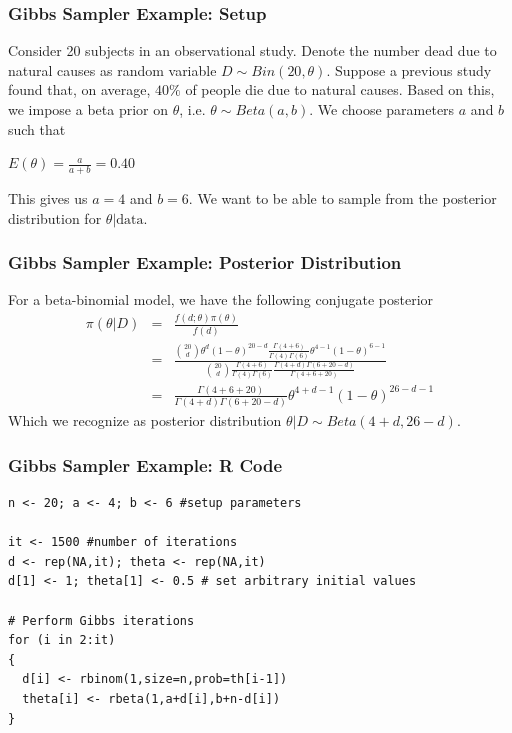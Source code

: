 \documentclass{beamer}
\begin{document}
\begin{frame}
\frametitle{Gibbs Sampler Example: Setup}
Consider 20 subjects in an observational study. Denote the number dead due to natural causes as random variable $D \sim Bin(20,\theta)$.  Suppose a previous study found that, on average, $40\%$ of people die due to natural causes. Based on this, we impose a beta prior on $\theta$, i.e. $\theta \sim Beta(a,b)$. We choose parameters $a$ and $b$ such that 
\begin{center}
$E(\theta) = \frac{a}{a+b} = 0.40$
\end{center}
This gives us $a = 4$ and $b = 6$. We want to be able to sample from the posterior distribution for $\theta|\text{data}$. 
\end{frame}

\begin{frame}
\frametitle{Gibbs Sampler Example: Posterior Distribution}
For a beta-binomial model, we have the following conjugate posterior
\begin{eqnarray*}
\pi(\theta|D) &=& \frac{f(d;\theta)\pi(\theta)}{f(d)} \\
&=& \frac{{20 \choose d}\theta^{d}(1-\theta)^{20-d} \frac{\Gamma(4 + 6)}{\Gamma(4)\Gamma(6)}\theta^{4-1}(1-\theta)^{6-1}}{{20 \choose d} \frac{\Gamma(4 + 6)}{\Gamma(4)\Gamma(6)} \frac{\Gamma(4 + d)\Gamma(6 + 20 - d)}{\Gamma(4+6+20)}} \\
&=& \frac{\Gamma(4+6+20)}{\Gamma(4 + d)\Gamma(6 + 20 - d)}\theta^{4+d-1}(1-\theta)^{26-d-1} 
\end{eqnarray*}
Which we recognize as posterior distribution $\theta|D \sim Beta(4+d, 26-d)$. 
\end{frame}

\begin{frame}[fragile]
\frametitle{Gibbs Sampler Example: R Code\footnotemark}
\begin{verbatim}
n <- 20; a <- 4; b <- 6 #setup parameters

it <- 1500 #number of iterations
d <- rep(NA,it); theta <- rep(NA,it) 
d[1] <- 1; theta[1] <- 0.5 # set arbitrary initial values

# Perform Gibbs iterations
for (i in 2:it)
{
  d[i] <- rbinom(1,size=n,prob=th[i-1])
  theta[i] <- rbeta(1,a+d[i],b+n-d[i])
}
\end{verbatim}
\end{frame}
\end{document}

